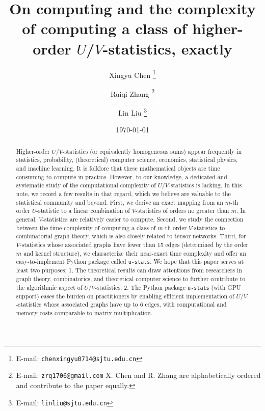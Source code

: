 \documentclass[letterpaper,11pt]{article}
\def\package{\texttt{u-stats}}
\begin{document}
\allowdisplaybreaks

\title{On computing and the complexity of computing a class of higher-order $U$/$V$-statistics, exactly}

\author[1]{Xingyu Chen \thanks{E-mail: \texttt{chenxingyu0714@sjtu.edu.cn}}}
\author[2]{Ruiqi Zhang \thanks{E-mail: \texttt{zrq1706@gmail.com} 
X. Chen and R. Zhang are alphabetically ordered and contribute to the paper equally.}}

\author[1, 3]{Lin Liu \thanks{E-mail: \texttt{linliu@sjtu.edu.cn}}}
    
\date{\today}
    
\maketitle
    
\begin{abstract}
Higher-order $U$/$V$-statistics (or equivalently homogeneous sums) appear frequently in statistics, probability, (theoretical) computer science, economics, statistical physics, and machine learning. It is folklore that these mathematical objects are time consuming to compute in practice. However, to our knowledge, a dedicated and systematic study of the computational complexity of $U$/$V$-statistics is lacking. In this note, we record a few results in that regard, which we believe are valuable to the statistical community and beyond. First, we derive an exact mapping from an $m$-th order $U$-statistic to a linear combination of $V$-statistics of orders no greater than $m$. In general, $V$-statistics are relatively easier to compute. Second, we study the connection between the time-complexity of computing a class of $m$-th order $V$-statistics to combinatorial graph theory, which is also closely related to tensor networks. Third, for $V$-statistics whose associated graphs have fewer than 15 edges (determined by the order $m$ and kernel structure), we characterize their near-exact time complexity and offer an easy-to-implement Python package called \package{}. We hope that this paper serves at least two purposes: 1. The theoretical results can draw attentions from researchers in graph theory, combinatorics, and theoretical computer science to further contribute to the algorithmic aspect of $U$/$V$-statistics; 2. The Python package \package{} (with GPU support) eases the burden on practitioners by enabling efficient implementation of $U$/$V$-statistics whose associated graphs have up to 6 edges, with computational and memory costs comparable to matrix multiplication.
\end{abstract}
\end{document}

